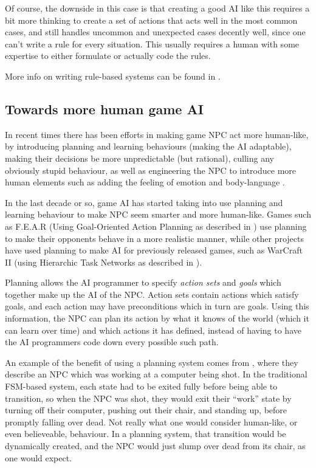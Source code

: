 \documentclass[]{report}
\begin{document}
Of course, the downside in this case is that creating a good AI like this
requires a bit more thinking to create a set of actions that acts well in the
most common cases, and still handles uncommon and unexpected cases decently
well, since one can't write a rule for every situation. This usually requires a
human with some expertise to either formulate or actually code the rules.

More info on writing rule-based systems can be found in
\citet[chap.~4]{kirby2011introduction}.

\subsection{Towards more human game AI}
\label{sec:towards-more-human}

In recent times there has been efforts in making game NPC act more human-like,
by introducing planning and learning behaviours (making the AI adaptable),
making their decisions be more unpredictable (but rational), culling any
obviously stupid behaviour, as well as engineering the NPC to introduce more
human elements such as adding the feeling of emotion and body-language
\citep{spronck2005adaptive}.

In the last decade or so, game AI has started taking into use planning and
learning behaviour to make NPC seem smarter and more human-like. Games such as
F.E.A.R (Using Goal-Oriented Action Planning as described in
\citet{orkin2006three}) use planning to make their opponents behave in a more
realistic manner, while other projects have used planning to make AI for
previously released games, such as WarCraft II (using Hierarchic Task Networks
as described in \citet{brickmanhtn}).

Planning allows the AI programmer to specify \emph{action sets} and \emph{goals}
which together make up the AI of the NPC. Action sets contain actions which
satisfy goals, and each action may have preconditions which in turn are
goals. Using this information, the NPC can plan its action by what it knows of
the world (which it can learn over time) and which actions it has defined,
instead of having to have the AI programmers code down every possible such path.

An example of the benefit of using a planning system comes from
\citet{orkin2006three}, where they describe an NPC which was working at a
computer being shot. In the traditional FSM-based system, each state had to be
exited fully before being able to transition, so when the NPC was shot, they
would exit their ``work'' state by turning off their computer, pushing out their
chair, and standing up, before promptly falling over dead. Not really what one
would consider human-like, or even believeable, behaviour. In a planning system,
that transition would be dynamically created, and the NPC would just slump over
dead from its chair, as one would expect.
\end{document}
